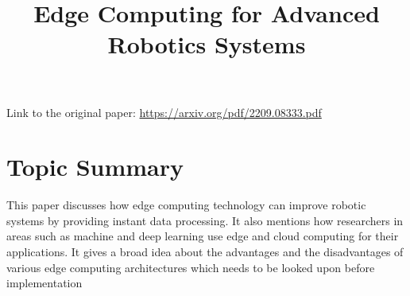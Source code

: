 \documentclass{article}
\title{Edge Computing for Advanced Robotics Systems}
\begin{document}
\maketitle


Link to the original paper: \href{https://arxiv.org/pdf/2209.08333.pdf}{https://arxiv.org/pdf/2209.08333.pdf}


\section{Topic Summary}

This paper discusses how edge computing technology can improve robotic systems by providing instant data processing. It also mentions how researchers in areas such as machine and deep learning use edge and cloud computing for their applications.
It gives a broad idea about the advantages and the disadvantages of various edge computing architectures which needs to be looked upon before implementation
\end{document}
